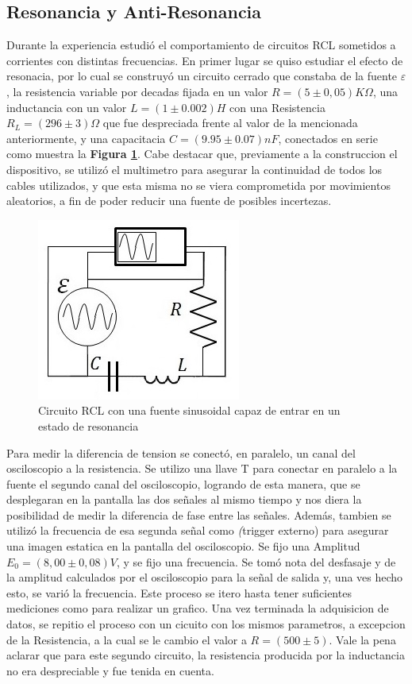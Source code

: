 \documentclass[11pt,a4paper]{article}
\begin{document}
\subsection{Resonancia y Anti-Resonancia}
Durante la experiencia estudió el comportamiento de circuitos RCL sometidos a corrientes con distintas frecuencias. En primer lugar se quiso estudiar el efecto de resonacia, por lo cual se construyó un circuito cerrado que constaba de la fuente $\varepsilon$, la resistencia variable por decadas fijada en un valor $R = (5 \pm 0,05)K\Omega$, una inductancia con un valor $L = (1 \pm 0.002)H$ con una Resistencia $R_{L}= (296\pm 3)\Omega$ que fue despreciada frente al valor de la mencionada anteriormente, y una capacitacia $C = (9.95 \pm 0.07)nF$, conectados en serie como muestra la \textbf{Figura \ref{fig:RCL-Res}}. Cabe destacar que, previamente a la construccion el dispositivo,  se utilizó el multimetro para asegurar la continuidad de todos los cables utilizados, y que esta misma no se viera comprometida por movimientos aleatorios, a fin de poder reducir una fuente de posibles incertezas.

\begin{figure}[h]
\centering
\includegraphics[scale=0.7]{Circuito-RCL-Resonante}
  \caption{Circuito RCL con una fuente sinusoidal capaz de entrar en un estado de resonancia}
  \label{fig:RCL-Res}
\end{figure}

Para medir la diferencia de tension se conectó, en paralelo, un canal del osciloscopio a la resistencia. Se utilizo una llave T para conectar en paralelo a la fuente el segundo canal del osciloscopio, logrando de esta manera, que se desplegaran en la pantalla las dos señales al mismo tiempo y nos diera la posibilidad de medir la diferencia de fase entre las señales. Además, tambien se utilizó la frecuencia de esa segunda señal como \textit(trigger externo) para asegurar una imagen estatica en la pantalla del osciloscopio. Se fijo una Amplitud $E_{0} = (8,00 \pm 0,08)V$, y se fijo una frecuencia. Se tomó nota del desfasaje y de la amplitud calculados por el osciloscopio para la señal de salida y, una ves hecho esto, se varió la frecuencia. Este proceso se itero hasta tener suficientes mediciones como para realizar un grafico. Una vez terminada la adquisicion de datos, se repitio el proceso con un cicuito con los mismos parametros, a excepcion de la Resistencia, a la cual se le cambio el valor a $R = (500 \pm 5)$. Vale la pena aclarar que para este segundo circuito, la resistencia producida por la inductancia no era despreciable y fue tenida en cuenta.
\end{document}
